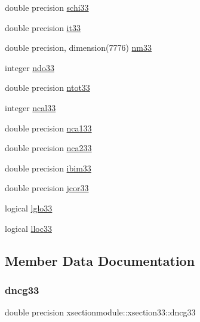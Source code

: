 \begin{DoxyCompactItemize}
\item 
double precision \hyperlink{structxsectionmodule_1_1xsection33_ab4f75e90bcd0771e357b66dfd8a37567}{schi33}
\item 
double precision \hyperlink{structxsectionmodule_1_1xsection33_a2dfcf4858d5e27623f2d94ff1eacbec5}{it33}
\item 
double precision, dimension(7776) \hyperlink{structxsectionmodule_1_1xsection33_a0327b4752cc3bf6f01464a6b5fc31fb2}{nm33}
\item 
integer \hyperlink{structxsectionmodule_1_1xsection33_a489f4394ccc24d196b50326a32d3f4f9}{ndo33}
\item 
double precision \hyperlink{structxsectionmodule_1_1xsection33_a40d5eaa4b1052259778acf0709b5997d}{ntot33}
\item 
integer \hyperlink{structxsectionmodule_1_1xsection33_aec43c78e3dc49376476d9e194da98867}{ncal33}
\item 
double precision \hyperlink{structxsectionmodule_1_1xsection33_a62859b081758c0b97d21c7d5a4f99ea9}{nca133}
\item 
double precision \hyperlink{structxsectionmodule_1_1xsection33_aed8912395bcbe0de577cc8c37d9a3add}{nca233}
\item 
double precision \hyperlink{structxsectionmodule_1_1xsection33_a94a83c5003d07490e39b6473f42c90d3}{ibim33}
\item 
double precision \hyperlink{structxsectionmodule_1_1xsection33_a7372d8a2512ad0f387266236c998f176}{jcor33}
\item 
logical \hyperlink{structxsectionmodule_1_1xsection33_af6e1592cd914a0a7968625637db766ce}{lglo33}
\item 
logical \hyperlink{structxsectionmodule_1_1xsection33_a5035e562dc0f42f2b62f1fa2630f38c1}{lloc33}
\end{DoxyCompactItemize}


\subsection{Member Data Documentation}
\mbox{\label{structxsectionmodule_1_1xsection33_a3747bd55fd97426218cbb35f999ba1b9}} 
\subsubsection{\texorpdfstring{dncg33}{dncg33}}
{\footnotesize\ttfamily double precision xsectionmodule\+::xsection33\+::dncg33}

